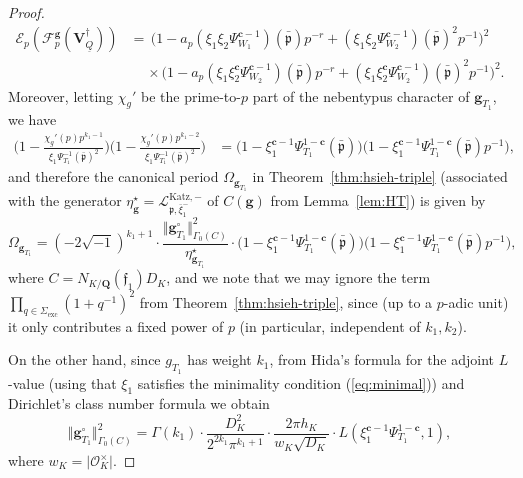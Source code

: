 \documentclass[10pt,letterpaper]{amsart}
\theoremstyle{plain}
\theoremstyle{definition}
\theoremstyle{definition}
\theoremstyle{plain}
\theoremstyle{plain}
\theoremstyle{plain}
\theoremstyle{remark}
\numberwithin{equation}{section}
\newcommand{\cc}{\mathbf{c}}
\newcommand{\ch}{\xi}
\newcommand{\pp}{\mathfrak{p}}
\newcommand{\ppbar}{\bar{\mathfrak{p}}}
\newcommand{\fkf}{\mathfrak{f}}
\def\cO{\mathcal O}
\newcommand{\VQdag}{{\mathbf{V}_{\underline{Q}}^\dagger}}
\newcommand{\Q}{\mathbf{Q}}
\newcommand{\bfg}{{\boldsymbol{g}}}
\begin{document}
\begin{proof}
\begin{equation}
\begin{aligned}
\mathcal{E}_p(\mathscr{F}_p^{\bfg}(\VQdag))&=\,\bigr(1-a_p(\ch_1\ch_2\Psi_{W_1}^{\cc-1})(\bar{\pp})p^{-r}+(\ch_1\ch_2\Psi_{W_2}^{\cc-1})(\bar{\pp})^2p^{-1}\bigl)^2\\
&\quad\,\times\bigr(1-a_p(\ch_1\ch_2^\cc\Psi_{W_2}^{\cc-1})(\bar{\pp})p^{-r}+(\ch_1\ch_2^\cc\Psi_{W_2}^{\cc-1})(\bar{\pp})^2p^{-1}\bigl)^2.
\end{aligned}
\end{equation}
Moreover, letting $\chi_g'$ be the prime-to-$p$ part of the nebentypus character of $\bfg_{T_1}$, we have
\begin{align*}
\biggl(1-\frac{\chi_g'(p)p^{k_1-1}}{\ch_1\Psi^{-1}_{T_1}(\bar{\pp})^2}\biggr)\biggl(1-\frac{\chi_g'(p)p^{k_1-2}}{\ch_1\Psi^{-1}_{T_1}(\bar{\pp})^2}\biggr)
&=\bigl(1-\ch_1^{\cc-1}\Psi_{T_1}^{1-\cc}(\ppbar)\bigr)\bigl(1-\ch_1^{\cc-1}\Psi^{1-\cc}_{T_1}(\ppbar)p^{-1}\bigr),
\end{align*}
and therefore the canonical period $\Omega_{\bfg_{T_1}}$ in Theorem~\ref{thm:hsieh-triple} (associated with the generator $\eta_{\bfg}^\star=\mathcal{L}_{\pp,\bar{\xi}_1^-}^{{\mathrm{Katz}},-}$ of $C(\bfg)$ from Lemma~\ref{lem:HT}) is given by
\begin{equation}\label{eq:period}
\Omega_{\bfg_{T_1}}=(-2\sqrt{-1})^{k_1+1}\cdot\frac{\Vert\bfg_{T_1}^\circ\Vert_{\Gamma_0(C)}^2}{\eta_{\bfg_{T_1}}^{\star}}\cdot\bigl(1-\ch_1^{\cc-1}\Psi_{T_1}^{1-\cc}(\ppbar)\bigr)\bigl(1-\ch_1^{\cc-1}\Psi^{1-\cc}_{T_1}(\ppbar)p^{-1}\bigr),
\end{equation}
where $C=N_{K/\Q}(\fkf_1)D_K$, and we note that we may ignore the term $\prod_{q\in\Sigma_{\mathrm{exc}}}(1+q^{-1})^2$ from Theorem~\ref{thm:hsieh-triple}, since (up to a $p$-adic unit) it only contributes a fixed power of $p$ (in particular, independent of $k_1,k_2$).
%

On the other hand, since $g_{T_1}$ has weight $k_1$, from Hida's formula for the adjoint $L$-value \cite[Thm.~7.1]{HT-ENS} (using that $\xi_1$ satisfies the minimality condition (\ref{eq:minimal})) and Dirichlet's class number formula we obtain %
\[
\Vert \bfg_{T_1}^\circ\Vert^2_{\Gamma_0(C)}=\Gamma(k_1)\cdot\frac{D_K^2}{2^{2k_1}\pi^{k_1+1}}\cdot\frac{2\pi h_K}{w_K\sqrt{D_K}}\cdot L(\ch_1^{\cc-1}\Psi_{T_1}^{1-\cc},1),
\]
where %
$w_K=\vert\cO_K^\times\vert$. 


\end{proof}
\end{document}
